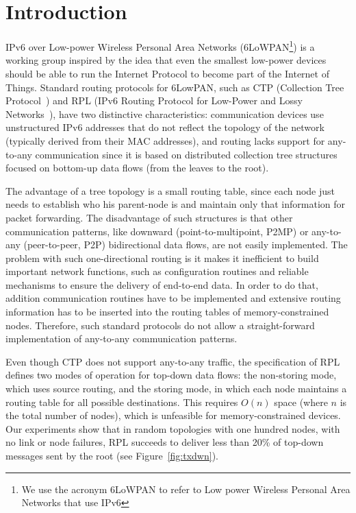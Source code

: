 \section{Introduction}

IPv6 over Low-power Wireless Personal Area Networks (6LoWPAN\footnote{We use the acronym 6LoWPAN to refer to Low power Wireless Personal Area Networks that use IPv6}) is a working group inspired by the idea that even the smallest low-power devices should be able to run the Internet Protocol to become part of the Internet of Things. Standard routing protocols for 6LowPAN, such as CTP (Collection Tree Protocol~\cite{Fonseca:2009}) and RPL (IPv6 Routing Protocol for Low-Power and Lossy Networks~\cite{rfc6550}), have two distinctive characteristics: communication devices use unstructured IPv6 addresses that do not reflect the topology of the network (typically derived from their MAC addresses), and routing lacks support for any-to-any communication since it is based on distributed collection tree structures focused on bottom-up data flows (from the leaves to the root).

The advantage of a tree topology is a small routing table, since each node just needs to establish who his parent-node is and maintain only that information for packet forwarding. The disadvantage of such structures is that other communication patterns, like downward (point-to-multipoint, P2MP) or any-to-any (peer-to-peer, P2P) bidirectional data flows, are not easily implemented. The problem with such one-directional routing is it makes it inefficient to build important network functions, such as configuration routines and reliable mechanisms to ensure the delivery of end-to-end data. In order to do that, addition communication routines have to be implemented and extensive routing information has to be inserted into the routing tables of memory-constrained nodes. Therefore, such standard protocols do not allow a straight-forward implementation of any-to-any communication patterns.

Even though CTP does not support any-to-any traffic, the specification of
RPL defines two modes of operation for top-down data flows: the non-storing
mode, which uses source routing, and the storing mode, in which each node
maintains a routing table for all possible destinations. This requires $O(n)$
space (where $n$ is the total number of nodes), which is unfeasible for
memory-constrained devices. Our experiments show that in random topologies with one hundred nodes, with no link or node failures, RPL succeeds to deliver less than 20\% of top-down messages sent by the root (see Figure~\ref{fig:txdwn}).

